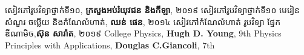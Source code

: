 \begin{thebibliography}{9}
	សៀវភៅរូបវិទ្យាថ្នាក់ទី១០, \textbf{ក្រសួងអប់រំយុវជន និងកីឡា}, ២០១៩
	 សៀវភៅរូបវិទ្យាថ្នាក់ទី១០ មេរៀន សំណួរ ចម្លើយ និងកំណែលំហាត់, \textbf{ឈន់ ផេន}, ២០១៤
	 សៀវភៅកំណែលំហាត់ រូបវិទ្យា ផ្នែកឌីណាមិច,\textbf{ស៊ុន សារ៉ាត}, ២០១៩
	 {\en College Physics, \textbf{Hugh D. Young}, 9th}
	 {\en Physics Principles with Applications, \textbf{Douglas C.Giancoli}, 7th}
\end{thebibliography}